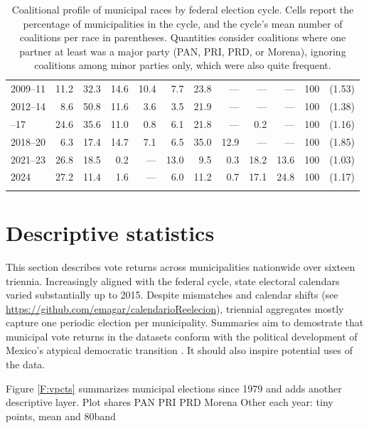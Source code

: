 \documentclass[letter,12pt]{article}
\begin{document}
\begin{table}
{\begin{tabular}{lrrrrrrrrrrc}
 2009--11&  11.2&  32.3&   14.6&   10.4&    7.7&      23.8&         ---&  ---&       ---& 100 & (1.53) \\
 2012--14&   8.6&  50.8&   11.6&    3.6&    3.5&      21.9&         ---&  ---&       ---& 100 & (1.38) \\ \hdashline
 2015--17&  24.6&  35.6&   11.0&    0.8&    6.1&      21.8&         ---&  0.2&       ---& 100 & (1.16) \\
 2018--20&   6.3&  17.4&   14.7&    7.1&    6.5&      35.0&        12.9&  ---&       ---& 100 & (1.85) \\
 2021--23&  26.8&  18.5&    0.2&    ---&   13.0&       9.5&         0.3& 18.2&      13.6& 100 & (1.03) \\
 2024    &  27.2&  11.4&    1.6&    ---&    6.0&      11.2&         0.7& 17.1&      24.8& 100 & (1.17) \\ 
     &      &      &       &       &       &          &            &     &          &       &        \\ [-1.8ex] 
  \hline
\end{tabular}
}
\caption{Coalitional profile of municipal races by federal election cycle. Cells report the percentage of municipalities in the cycle, and the cycle's mean number of coalitions per race in parentheses. Quantities consider coalitions where one partner at least was a major party (PAN, PRI, PRD, or Morena), ignoring coalitions among minor parties only, which were also quite frequent.}\label{T:coal}
\end{table}

\section{Descriptive statistics}

This section describes vote returns across municipalities nationwide over sixteen triennia. Increasingly aligned with the federal cycle, state electoral calendars varied substantially up to 2015. Despite mismatches and calendar shifts (see \url{https://github.com/emagar/calendarioReelecion}), triennial aggregates mostly capture one periodic election per municipality. Summaries aim to demostrate that municipal vote returns in the datasets conform with the political development of Mexico's atypical democratic transition \citep[eg.][]{cornelius.1996}. It should also inspire potential uses of the data. 

Figure \ref{F:vpcts} summarizes municipal elections since 1979 and adds another descriptive layer. Plot shares PAN PRI PRD Morena Other each year: tiny points, mean and 80band 
\end{document}
